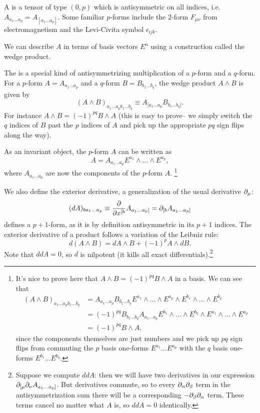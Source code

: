 \begin{defn}
A  is a tensor of type $(0,p)$ which is antisymmetric on all indices, i.e. $A_{a_1\ldots a_p}=A_{[a_1 \ldots a_p]}$. Some familiar $p$-forms include the $2$-form $F_{\mu\nu}$ from electromagnetism and the Levi-Civita symbol $\epsilon_{ijk}$.
\end{defn}
We can describe $A$ in terms of basis vectors $E^a$ using a construction called the wedge product.
\begin{defn}
The  is a special kind of antisymmetrizing multiplication of a $p$-form and a $q$-form. For a $p$-form $A=A_{a_1\ldots a_p}$ and a $q$-form $B=B_{b_1\ldots b_q}$, the wedge product $A\wedge B$ is given by
$$(A\wedge B)_{a_1\ldots a_p b_1 \ldots b_q}\equiv A_{[a_1\ldots a_p}B_{b_1\ldots b_q]}.$$
For instance $A\wedge B = (-1)^{pq}B \wedge A$ (this is easy to prove-- we simply switch the $q$ indices of $B$ past the $p$ indices of $A$ and pick up the appropriate $pq$ sign flips along the way).
\end{defn}
As an invariant object, the $p$-form $A$ can be written as $$A=A_{a_1\ldots a_p} E^{a_1}\wedge \ldots \wedge E^{a_p},$$ where $A_{a_1\ldots a_p}$ are now the components of the $p$-form $A$.%
    \footnote{It's nice to prove here that $A\wedge B=(-1)^{pq} B\wedge A$ in a basis. We can see that
    \begin{align*}
        (A\wedge B)_{a_1\ldots a_p b_1 \ldots b_q} &= A_{a_1\ldots a_p} B_{b_1\ldots b_q} E^{a_1}\wedge \ldots \wedge E^{a_p} \wedge E^{b_1} \wedge \ldots \wedge E^{b_q}\\
        &= (-1)^{pq} B_{b_1 \ldots b_q} A_{a_1\ldots a_p} E^{b_1} \wedge \ldots \wedge E^{b_q} \wedge E^{a_1} \wedge \ldots \wedge E^{a_p}\\
        &= (-1)^{pq} B\wedge A,
    \end{align*}
    since the components themselves are just numbers and we pick up $pq$ sign flips from commuting the $p$ basis one-forms $E^{a_1}\ldots E^{a_p}$ with the $q$ basis one-forms $E^{b_1}\ldots E^{b_q}$.}

\begin{defn}
We also define the exterior derivative, a generalization of the usual derivative $\partial_\mu$:
$$(dA)_{ba_1 \ldots a_p} \equiv \frac{\partial }{\partial {x^{[b}}} A_{a_1 \ldots a_p]}=\partial_{[b}A_{a_1 \ldots a_p]}$$
defines a $p+1$-form, as it is by definition antisymmetric in its $p+1$ indices.
The exterior derivative of a product follows a variation of the Leibniz rule:
$$d(A\wedge B)=dA\wedge B +(-1)^p A\wedge dB.$$
Note that $ddA=0$, so $d$ is nilpotent (it kills all exact differentials).\footnote{Suppose we compute $ddA$: then we will have two derivatives in our expression $\partial_{[\mu} \partial_\nu A_{a_1\ldots a_p]}$. But derivatives commute, so to every $\partial_\alpha \partial_\beta$ term in the antisymmetrization sum there will be a corresponding $-\partial_\beta \partial_\alpha$ term. These terms cancel no matter what $A$ is, so $ddA=0$ identically.}
\end{defn}


